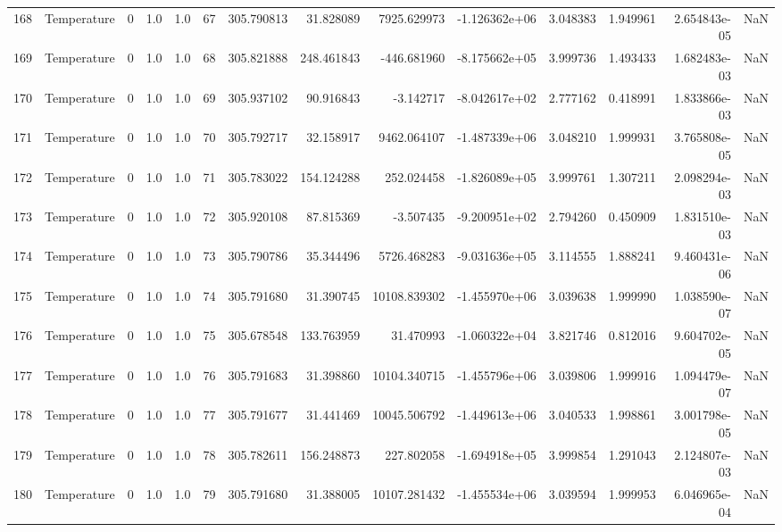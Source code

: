 \begin{tabular}{llrrrrrrrrrrrr}
168 &  Temperature &       0 &  1.0 &  1.0 &   67 &  305.790813 &    31.828089 &    7925.629973 & -1.126362e+06 &  3.048383 &  1.949961 &  2.654843e-05 &      NaN \\
169 &  Temperature &       0 &  1.0 &  1.0 &   68 &  305.821888 &   248.461843 &    -446.681960 & -8.175662e+05 &  3.999736 &  1.493433 &  1.682483e-03 &      NaN \\
170 &  Temperature &       0 &  1.0 &  1.0 &   69 &  305.937102 &    90.916843 &      -3.142717 & -8.042617e+02 &  2.777162 &  0.418991 &  1.833866e-03 &      NaN \\
171 &  Temperature &       0 &  1.0 &  1.0 &   70 &  305.792717 &    32.158917 &    9462.064107 & -1.487339e+06 &  3.048210 &  1.999931 &  3.765808e-05 &      NaN \\
172 &  Temperature &       0 &  1.0 &  1.0 &   71 &  305.783022 &   154.124288 &     252.024458 & -1.826089e+05 &  3.999761 &  1.307211 &  2.098294e-03 &      NaN \\
173 &  Temperature &       0 &  1.0 &  1.0 &   72 &  305.920108 &    87.815369 &      -3.507435 & -9.200951e+02 &  2.794260 &  0.450909 &  1.831510e-03 &      NaN \\
174 &  Temperature &       0 &  1.0 &  1.0 &   73 &  305.790786 &    35.344496 &    5726.468283 & -9.031636e+05 &  3.114555 &  1.888241 &  9.460431e-06 &      NaN \\
175 &  Temperature &       0 &  1.0 &  1.0 &   74 &  305.791680 &    31.390745 &   10108.839302 & -1.455970e+06 &  3.039638 &  1.999990 &  1.038590e-07 &      NaN \\
176 &  Temperature &       0 &  1.0 &  1.0 &   75 &  305.678548 &   133.763959 &      31.470993 & -1.060322e+04 &  3.821746 &  0.812016 &  9.604702e-05 &      NaN \\
177 &  Temperature &       0 &  1.0 &  1.0 &   76 &  305.791683 &    31.398860 &   10104.340715 & -1.455796e+06 &  3.039806 &  1.999916 &  1.094479e-07 &      NaN \\
178 &  Temperature &       0 &  1.0 &  1.0 &   77 &  305.791677 &    31.441469 &   10045.506792 & -1.449613e+06 &  3.040533 &  1.998861 &  3.001798e-05 &      NaN \\
179 &  Temperature &       0 &  1.0 &  1.0 &   78 &  305.782611 &   156.248873 &     227.802058 & -1.694918e+05 &  3.999854 &  1.291043 &  2.124807e-03 &      NaN \\
180 &  Temperature &       0 &  1.0 &  1.0 &   79 &  305.791680 &    31.388005 &   10107.281432 & -1.455534e+06 &  3.039594 &  1.999953 &  6.046965e-04 &      NaN \\

\end{tabular}
